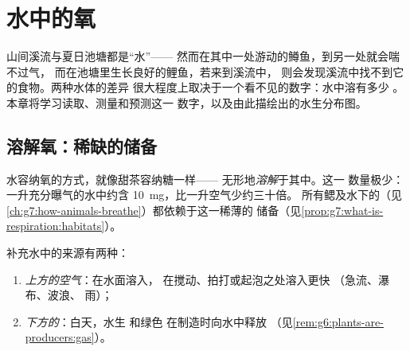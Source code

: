 \chapter{水中的氧}\label{ch:g7:oxygen-in-the-water}

山间溪流与夏日池塘都是“水”——
然而在其中一处游动的鳟鱼，到另一处就会喘不过气，
而在池塘里生长良好的鲤鱼，若来到溪流中，
则会发现溪流中找不到它的食物。两种水体的差异
很大程度上取决于一个看不见的数字：水中溶有多少
。本章将学习读取、测量和预测这一
数字，以及由此描绘出的水生分布图。

\section{溶解氧：稀缺的储备}

\begin{definition}[溶解氧]\label{def:g7:oxygen-in-the-water:dissolved}
水容纳氧的方式，就像甜茶容纳糖一样——
无形地\emph{溶解}于其中。这一
数量极少：一升充分曝气的水中约含
\qty{10}{mg}，比一升空气少约三十倍。
所有鳃及水下的（见
\cref{ch:g7:how-animals-breathe}）都依赖于这一稀薄的
储备（见\cref{prop:g7:what-is-respiration:habitats}）。
\end{definition}

\begin{proposition}[补充溶解氧的来源]\label{prop:g7:oxygen-in-the-water:fills}
补充水中的来源有两种：
\begin{enumerate}
  \item \emph{上方的空气}：在水面溶入，
        在搅动、拍打或起泡之处溶入更快
        （急流、瀑布、波浪、
        雨）；
  \item \emph{下方的}：白天，水生
        和绿色
        在制造时向水中释放
        （见\cref{rem:g6:plants-are-producers:gas}）。
\end{enumerate}
\end{proposition}
\admitted

